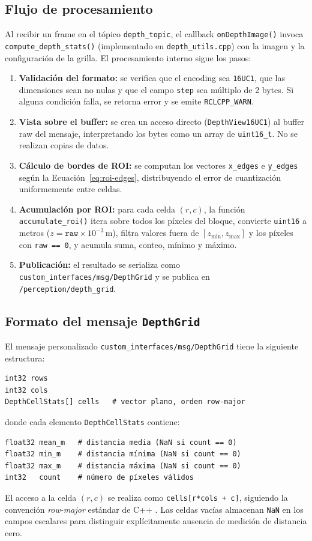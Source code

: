 \subsection{Flujo de procesamiento}

Al recibir un frame en el tópico \texttt{depth\_topic}, el callback \texttt{onDepthImage()} invoca \texttt{compute\_depth\_stats()} (implementado en \texttt{depth\_utils.cpp}) con la imagen y la configuración de la grilla. El procesamiento interno sigue los pasos:

\begin{enumerate}
  \item \textbf{Validación del formato:} se verifica que el encoding sea \texttt{16UC1}, que las dimensiones sean no nulas y que el campo \texttt{step} sea múltiplo de 2 bytes. Si alguna condición falla, se retorna error y se emite \texttt{RCLCPP\_WARN}.
  \item \textbf{Vista sobre el buffer:} se crea un acceso directo (\texttt{DepthView16UC1}) al buffer raw del mensaje, interpretando los bytes como un array de \texttt{uint16\_t}. No se realizan copias de datos.
  \item \textbf{Cálculo de bordes de ROI:} se computan los vectores \texttt{x\_edges} e \texttt{y\_edges} según la Ecuación~\eqref{eq:roi-edges}, distribuyendo el error de cuantización uniformemente entre celdas.
  \item \textbf{Acumulación por ROI:} para cada celda $(r,c)$, la función \texttt{accumulate\_roi()} itera sobre todos los píxeles del bloque, convierte \texttt{uint16} a metros ($z = \texttt{raw} \times 10^{-3}\,\text{m}$), filtra valores fuera de $[z_{\min}, z_{\max}]$ y los píxeles con \texttt{raw == 0}, y acumula suma, conteo, mínimo y máximo.
  \item \textbf{Publicación:} el resultado se serializa como \texttt{custom\_interfaces/msg/DepthGrid} y se publica en \texttt{/perception/depth\_grid}.
\end{enumerate}

\subsection{Formato del mensaje \texttt{DepthGrid}}

El mensaje personalizado \texttt{custom\_interfaces/msg/DepthGrid} tiene la siguiente estructura:
\begin{verbatim}
int32 rows
int32 cols
DepthCellStats[] cells   # vector plano, orden row-major
\end{verbatim}
donde cada elemento \texttt{DepthCellStats} contiene:
\begin{verbatim}
float32 mean_m   # distancia media (NaN si count == 0)
float32 min_m    # distancia mínima (NaN si count == 0)
float32 max_m    # distancia máxima (NaN si count == 0)
int32   count    # número de píxeles válidos
\end{verbatim}
El acceso a la celda $(r,c)$ se realiza como \texttt{cells[r*cols + c]}, siguiendo la convención \emph{row-major} estándar de C++ \cite{stroustrup2013cpp}. Las celdas vacías almacenan \texttt{NaN} en los campos escalares para distinguir explícitamente ausencia de medición de distancia cero.

